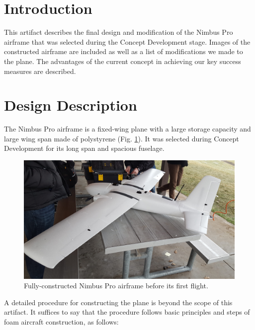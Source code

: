 \documentclass[]{auvsi_doc}
\begin{document}
\begin{AUVSITitlePage}
\begin{artifacttable}
\end{artifacttable}
\end{AUVSITitlePage}

\section{Introduction}
This artifact describes the final design and modification of the Nimbus Pro airframe that was selected during the Concept Development stage. Images of the constructed airframe are included as well as a list of modifications we made to the plane. The advantages of the current concept in achieving our key success measures are described.

\section{Design Description}
The Nimbus Pro airframe is a fixed-wing plane with a large storage capacity and large wing span made of polystyrene (Fig. \ref{fig:plane1}). It was selected during Concept Development for its long span and spacious fuselage.

\begin{figure}[h!]
	\centering
	\includegraphics[width=.9\columnwidth]{figs/plane1}
	\caption{Fully-constructed Nimbus Pro airframe before its first flight.}
	\label{fig:plane1}
\end{figure}

A detailed procedure for constructing the plane is beyond the scope of this artifact. It suffices to say that the procedure follows basic principles and steps of foam aircraft construction, as follows:
\end{document}
